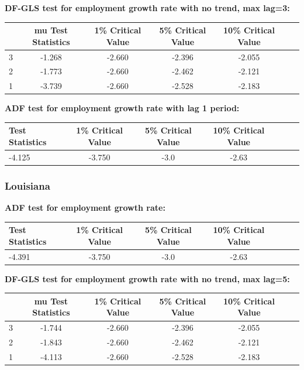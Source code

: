 \documentclass{article}
\begin{document}
\vspace{0.5cm}

\noindent \textbf{DF-GLS test for employment growth rate with no trend, max lag=3:}
\begin{center}
\resizebox{13cm}{!}
{
\begin{tabular}{lcccccc} \hline
    [lags] & mu Test Statistics & 1\% Critical Value& 5\% Critical Value & 10\% Critical Value \\ \hline
    3      & -1.268 & -2.660 & -2.396 & -2.055 \\ 
    2      & -1.773 & -2.660 & -2.462 & -2.121 \\
    1      & -3.739 & -2.660 & -2.528 & -2.183 \\ \hline
\end{tabular}
}
\end{center}

\vspace{0.5cm}

\noindent \textbf{ADF test for employment growth rate with lag 1 period: }
\begin{center}
\resizebox{13cm}{!}
{
\begin{tabular}{lcccccc} \hline
    Test Statistics & 1\% Critical Value& 5\% Critical Value & 10\% Critical Value \\ \hline
    -4.125 & -3.750 & -3.0 & -2.63 \\ \hline
\end{tabular}
}
\end{center}

\vspace{0.5cm}

\subsubsection{Louisiana}
\noindent \textbf{ADF test for employment growth rate: }
\begin{center}
    \resizebox{13cm}{!}
    {
    \begin{tabular}{lcccccc} \hline
        Test Statistics & 1\% Critical Value& 5\% Critical Value & 10\% Critical Value \\ \hline
        -4.391 & -3.750 & -3.0 & -2.63 \\ \hline
    \end{tabular}
    }
\end{center}

\vspace{0.5cm}

\noindent \textbf{DF-GLS test for employment growth rate with no trend, max lag=5:}
\begin{center}
\resizebox{13cm}{!}
{
\begin{tabular}{lcccccc} \hline
    [lags] & mu Test Statistics & 1\% Critical Value& 5\% Critical Value & 10\% Critical Value \\ \hline
    3      & -1.744 & -2.660 & -2.396 & -2.055 \\ 
    2      & -1.843 & -2.660 & -2.462 & -2.121 \\
    1      & -4.113 & -2.660 & -2.528 & -2.183 \\ \hline
\end{tabular}
}
\end{center}
\end{document}
